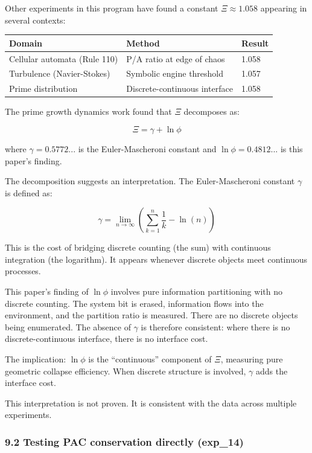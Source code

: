 \documentclass[
  11pt,
  a4paper]{article}
\begin{document}
Other experiments in this program have found a constant
\(\Xi \approx 1.058\) appearing in several contexts:

\begin{longtable}[]{@{}lll@{}}
\toprule\noalign{}
Domain & Method & Result \\
\midrule\noalign{}
\endhead
\bottomrule\noalign{}
\endlastfoot
Cellular automata (Rule 110) & P/A ratio at edge of chaos & 1.058 \\
Turbulence (Navier-Stokes) & Symbolic engine threshold & 1.057 \\
Prime distribution & Discrete-continuous interface & 1.058 \\
\end{longtable}

The prime growth dynamics work found that \(\Xi\) decomposes as:

\[\Xi = \gamma + \ln\phi\]

where \(\gamma = 0.5772...\) is the Euler-Mascheroni constant and
\(\ln\phi = 0.4812...\) is this paper's finding.

The decomposition suggests an interpretation. The Euler-Mascheroni
constant \(\gamma\) is defined as:

\[\gamma = \lim_{n \to \infty} \left( \sum_{k=1}^{n} \frac{1}{k} - \ln(n) \right)\]

This is the cost of bridging discrete counting (the sum) with continuous
integration (the logarithm). It appears whenever discrete objects meet
continuous processes.

This paper's finding of \(\ln\phi\) involves pure information
partitioning with no discrete counting. The system bit is erased,
information flows into the environment, and the partition ratio is
measured. There are no discrete objects being enumerated. The absence of
\(\gamma\) is therefore consistent: where there is no
discrete-continuous interface, there is no interface cost.

The implication: \(\ln\phi\) is the ``continuous'' component of \(\Xi\),
measuring pure geometric collapse efficiency. When discrete structure is
involved, \(\gamma\) adds the interface cost.

This interpretation is not proven. It is consistent with the data across
multiple experiments.

\subsubsection{9.2 Testing PAC conservation directly
(exp\_14)}\label{testing-pac-conservation-directly-exp_14}
\end{document}

